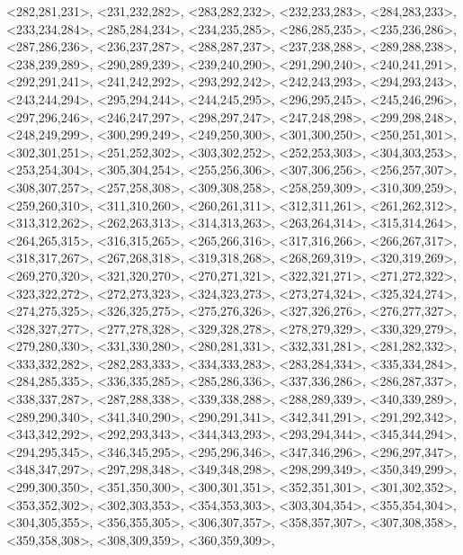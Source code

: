 \documentclass[a4paper,10pt]{article}
\begin{document}
\begin{eulernotebook}
\begin{euleroutput}
  <282,281,231>,
  <231,232,282>,
  <283,282,232>,
  <232,233,283>,
  <284,283,233>,
  <233,234,284>,
  <285,284,234>,
  <234,235,285>,
  <286,285,235>,
  <235,236,286>,
  <287,286,236>,
  <236,237,287>,
  <288,287,237>,
  <237,238,288>,
  <289,288,238>,
  <238,239,289>,
  <290,289,239>,
  <239,240,290>,
  <291,290,240>,
  <240,241,291>,
  <292,291,241>,
  <241,242,292>,
  <293,292,242>,
  <242,243,293>,
  <294,293,243>,
  <243,244,294>,
  <295,294,244>,
  <244,245,295>,
  <296,295,245>,
  <245,246,296>,
  <297,296,246>,
  <246,247,297>,
  <298,297,247>,
  <247,248,298>,
  <299,298,248>,
  <248,249,299>,
  <300,299,249>,
  <249,250,300>,
  <301,300,250>,
  <250,251,301>,
  <302,301,251>,
  <251,252,302>,
  <303,302,252>,
  <252,253,303>,
  <304,303,253>,
  <253,254,304>,
  <305,304,254>,
  <255,256,306>,
  <307,306,256>,
  <256,257,307>,
  <308,307,257>,
  <257,258,308>,
  <309,308,258>,
  <258,259,309>,
  <310,309,259>,
  <259,260,310>,
  <311,310,260>,
  <260,261,311>,
  <312,311,261>,
  <261,262,312>,
  <313,312,262>,
  <262,263,313>,
  <314,313,263>,
  <263,264,314>,
  <315,314,264>,
  <264,265,315>,
  <316,315,265>,
  <265,266,316>,
  <317,316,266>,
  <266,267,317>,
  <318,317,267>,
  <267,268,318>,
  <319,318,268>,
  <268,269,319>,
  <320,319,269>,
  <269,270,320>,
  <321,320,270>,
  <270,271,321>,
  <322,321,271>,
  <271,272,322>,
  <323,322,272>,
  <272,273,323>,
  <324,323,273>,
  <273,274,324>,
  <325,324,274>,
  <274,275,325>,
  <326,325,275>,
  <275,276,326>,
  <327,326,276>,
  <276,277,327>,
  <328,327,277>,
  <277,278,328>,
  <329,328,278>,
  <278,279,329>,
  <330,329,279>,
  <279,280,330>,
  <331,330,280>,
  <280,281,331>,
  <332,331,281>,
  <281,282,332>,
  <333,332,282>,
  <282,283,333>,
  <334,333,283>,
  <283,284,334>,
  <335,334,284>,
  <284,285,335>,
  <336,335,285>,
  <285,286,336>,
  <337,336,286>,
  <286,287,337>,
  <338,337,287>,
  <287,288,338>,
  <339,338,288>,
  <288,289,339>,
  <340,339,289>,
  <289,290,340>,
  <341,340,290>,
  <290,291,341>,
  <342,341,291>,
  <291,292,342>,
  <343,342,292>,
  <292,293,343>,
  <344,343,293>,
  <293,294,344>,
  <345,344,294>,
  <294,295,345>,
  <346,345,295>,
  <295,296,346>,
  <347,346,296>,
  <296,297,347>,
  <348,347,297>,
  <297,298,348>,
  <349,348,298>,
  <298,299,349>,
  <350,349,299>,
  <299,300,350>,
  <351,350,300>,
  <300,301,351>,
  <352,351,301>,
  <301,302,352>,
  <353,352,302>,
  <302,303,353>,
  <354,353,303>,
  <303,304,354>,
  <355,354,304>,
  <304,305,355>,
  <356,355,305>,
  <306,307,357>,
  <358,357,307>,
  <307,308,358>,
  <359,358,308>,
  <308,309,359>,
  <360,359,309>,

\end{euleroutput}
\end{eulernotebook}
\end{document}
